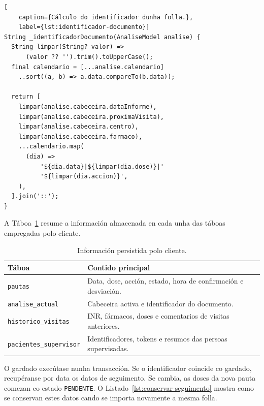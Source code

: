 \begin{lstlisting}[
    caption={Cálculo do identificador dunha folla.},
    label={lst:identificador-documento}]
String _identificadorDocumento(AnaliseModel analise) {
  String limpar(String? valor) =>
      (valor ?? '').trim().toUpperCase();
  final calendario = [...analise.calendario]
    ..sort((a, b) => a.data.compareTo(b.data));

  return [
    limpar(analise.cabeceira.dataInforme),
    limpar(analise.cabeceira.proximaVisita),
    limpar(analise.cabeceira.centro),
    limpar(analise.cabeceira.farmaco),
    ...calendario.map(
      (dia) =>
          '${dia.data}|${limpar(dia.dose)}|'
          '${limpar(dia.accion)}',
    ),
  ].join('::');
}
\end{lstlisting}
A Táboa~\ref{tab:persistencia-cliente} resume a información almacenada en cada unha das táboas empregadas polo cliente.

\begin{table}[htbp]
    \centering
    \caption{Información persistida polo cliente.}
    \label{tab:persistencia-cliente}
    \begin{tabularx}{\textwidth}{l X}
        \toprule
        \textbf{Táboa} & \textbf{Contido principal} \\
        \midrule
        \texttt{pautas} & Data, dose, acción, estado, hora de confirmación e desviación. \\
        \texttt{analise\_actual} & Cabeceira activa e identificador do documento. \\
        \texttt{historico\_visitas} & INR, fármacos, doses e comentarios de visitas anteriores. \\
        \texttt{pacientes\_supervisor} & Identificadores, tokens e resumos das persoas supervisadas. \\
        \bottomrule
    \end{tabularx}
\end{table}

\FloatBarrier

O gardado execútase nunha transacción. Se o identificador coincide co gardado,
recupéranse por data os datos de seguimento. Se cambia, as doses da nova pauta
comezan co estado \texttt{PENDENTE}. O Listado~\ref{lst:conservar-seguimento}
mostra como se conservan estes datos cando se importa novamente a mesma folla.

